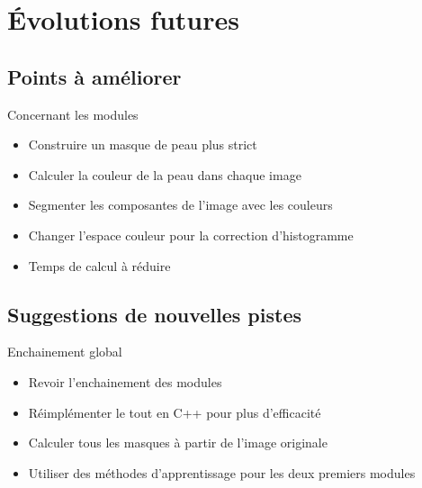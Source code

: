 \documentclass{beamer}
\begin{document}
\section{Évolutions futures}

\subsection{Points à améliorer}

\begin{frame}{Concernant les modules}
\begin{itemize}
\item Construire un masque de peau plus strict
\item Calculer la couleur de la peau dans chaque image
\item Segmenter les composantes de l'image avec les couleurs
\item Changer l'espace couleur pour la correction d'histogramme
\item Temps de calcul à réduire
\end{itemize}
\end{frame}

\subsection{Suggestions de nouvelles pistes}

\begin{frame}{Enchainement global}
\begin{itemize}
\item Revoir l'enchainement des modules
\item Réimplémenter le tout en C++ pour plus d'efficacité
\item Calculer tous les masques à partir de l'image originale
\item Utiliser des méthodes d'apprentissage pour les deux premiers modules
\end{itemize}
\end{frame}

\end{document}
